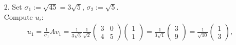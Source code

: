 {\begin{enumerate}
\begin{enumerate}
\begin{itemize}
\begin{enumerate}
				Choose $s=\frac{1}{\sqrt{2}}$ and $v_1 =\frac{1}{\sqrt{2}}\begin{pmatrix}1\\1\end{pmatrix}$.
				\item[b)] 
				\begin{align*}
				&(A^TA-\lambda_2 I)=\begin{pmatrix}20&20\\20&20\end{pmatrix}\\
				&\left(
				\begin{tabular}{cc|c} 20&20&0\\20&20&0\end{tabular}
				\right)
				\rightsquigarrow \left(
				\begin{tabular}{cc|c} 20&20&0\\0&0&0\end{tabular}
				\right)\\&
				\Rightarrow\ \  x_1+x_2=0\ \ \Rightarrow\ \ x_1=-x_2.
				\end{align*}
				$\Rightarrow\ \ v_2\in\{s\begin{pmatrix}-1\\1\end{pmatrix}:s\in\mathbb{R}\}$\\
				Choose $s=\frac{1}{\sqrt{2}}$ and $v_2 =\frac{1}{\sqrt{2}}\begin{pmatrix}-1\\1\end{pmatrix}$.
			\end{enumerate}
		\end{itemize}
		\item[2.]
		Set $\sigma_1:=\sqrt{45}=3\sqrt{5}$, $\sigma_2:=\sqrt{5}$.
		~\\ 
		Compute $u_i$:
		\begin{align*}
		&u_1=\frac{1}{\sigma_1}Av_1
		=\frac{1}{3\sqrt{5}}\frac{1}{\sqrt{2}}\begin{pmatrix}3&0\\4&5\end{pmatrix}\begin{pmatrix}1\\1\end{pmatrix}
		=\frac{1}{3\sqrt{1}}\begin{pmatrix}3\\9\end{pmatrix}=\frac{1}{\sqrt{10}}\begin{pmatrix}1\\3\end{pmatrix},\\

\end{align*}
\end{enumerate}
\end{enumerate}}
